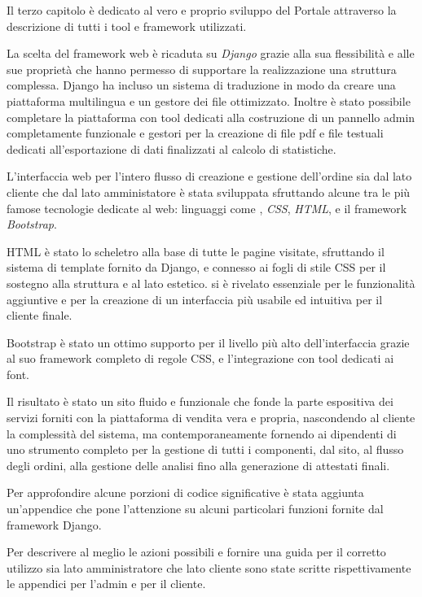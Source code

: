 \documentclass[12pt,a4paper]{scrartcl}
\begin{document}
Il terzo capitolo è dedicato al vero e proprio sviluppo del Portale attraverso la descrizione di tutti i tool e framework utilizzati.

La scelta del framework web è ricaduta su \emph{Django} grazie alla sua flessibilità e alle sue proprietà che hanno permesso di supportare la realizzazione una struttura complessa. Django ha incluso un sistema di traduzione in modo da creare una piattaforma multilingua e un gestore dei file ottimizzato. Inoltre è stato possibile completare la piattaforma con tool dedicati alla costruzione di un pannello admin completamente funzionale e gestori per la creazione di file pdf e file testuali dedicati all'esportazione di dati finalizzati al calcolo di statistiche.

L'interfaccia web per l'intero flusso di creazione e gestione dell'ordine sia dal lato cliente che dal lato amministatore è stata sviluppata sfruttando alcune tra le più famose tecnologie dedicate al web: linguaggi come \emph{{\js}}, \emph{CSS}, \emph{HTML}, e il framework \emph{Bootstrap}.

HTML è stato lo scheletro alla base di tutte le pagine visitate, sfruttando il sistema di template fornito da Django, e connesso ai fogli di stile CSS per il sostegno alla struttura e al lato estetico. {\js} si è rivelato essenziale per le funzionalità aggiuntive e per la creazione di un interfaccia più usabile ed intuitiva per il cliente finale.

Bootstrap è stato un ottimo supporto per il livello più alto dell'interfaccia grazie al suo framework completo di regole CSS, {\js} e l'integrazione con tool dedicati ai font.


Il risultato è stato un sito fluido e funzionale che fonde la parte espositiva dei servizi forniti con la piattaforma di vendita vera e propria, nascondendo al cliente la complessità del sistema, ma contemporaneamente fornendo ai dipendenti di {\fem} uno strumento completo per la gestione di tutti i componenti, dal sito, al flusso degli ordini, alla gestione delle analisi fino alla generazione di attestati finali.

Per approfondire alcune porzioni di codice significative è stata aggiunta un'appendice che pone l'attenzione su alcuni particolari funzioni fornite dal framework Django.

Per descrivere al meglio le azioni possibili e fornire una guida per il corretto utilizzo sia lato amministratore che lato cliente sono state scritte rispettivamente le appendici per l'admin e per il cliente.
\end{document}

